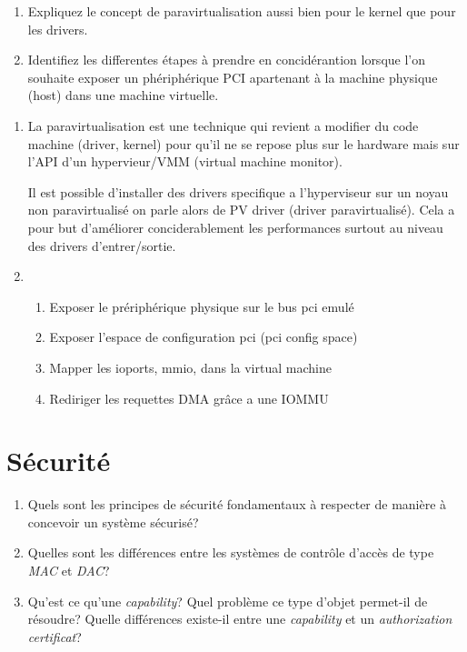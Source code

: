 \begin{enumerate}
  \item
        Expliquez le concept de paravirtualisation aussi bien pour le kernel
        que pour les drivers.
  \item 
        Identifiez les differentes \'etapes \`a prendre en concid\'erantion
        lorsque l'on souhaite exposer un ph\'eriph\'erique PCI apartenant \`a la machine
        physique (host) dans une machine virtuelle.
\end{enumerate}

\begin{correction}

\begin{enumerate}
  \item
        La paravirtualisation est une technique qui revient a modifier du code
        machine (driver, kernel) pour qu'il ne se repose plus sur le hardware
        mais sur l'API d'un hypervieur/VMM (virtual machine monitor).

        Il est possible d'installer des drivers specifique a l'hyperviseur sur
        un noyau non paravirtualis\'e on parle alors de PV driver (driver
        paravirtualis\'e). Cela a pour but d'am\'eliorer conciderablement les
        performances surtout au niveau des drivers d'entrer/sortie.
  \item
       \begin{enumerate}
       \item Exposer le pr\'eriph\'erique physique sur le bus pci emul\'e
       \item Exposer l'espace de configuration pci (pci config space)
       \item Mapper les ioports, mmio, dans la virtual machine
       \item Rediriger les requettes DMA gr\^ace a une IOMMU
       \end{enumerate}
\end{enumerate}

\end{correction}

% 
%

\section{S\'ecurit\'e
         }

\begin{enumerate}
  \item
    Quels sont les principes de s\'ecurit\'e fondamentaux \`a respecter
    de mani\`ere \`a concevoir un syst\`eme s\'ecuris\'e?
  \item
    Quelles sont les diff\'erences entre les syst\`emes de contr\^ole d'acc\`es
    de type \textit{MAC} et \textit{DAC}?
  \item
    Qu'est ce qu'une \textit{capability}? Quel probl\`eme ce type d'objet
    permet-il de r\'esoudre? Quelle diff\'erences existe-il entre une
    \textit{capability} et un \textit{authorization certificat}?
\end{enumerate}

